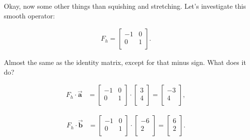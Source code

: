 Okay, now some other things than squishing and stretching. Let's investigate
this smooth operator:

\vspace{-.15in}
\begin{align*}
F_{h} =
\begin{bmatrix}
-1 & 0 \\
0 & 1 \\
\end{bmatrix}.
\end{align*}
\vspace{-.15in}

Almost the same as the identity matrix, except for that minus sign. What does
it do?

\vspace{-.15in}
\begin{align*}
F_{h} \cdot \overrightarrow{\textbf{a}} &=
\begin{bmatrix}
-1 & 0 \\
0 & 1 \\
\end{bmatrix} \cdot
\begin{bmatrix}
3 \\ 4 \\
\end{bmatrix} =
\begin{bmatrix}
-3 \\ 4 \\
\end{bmatrix},
\end{align*}

\vspace{-.15in}
\begin{align*}
F_{h} \cdot \overrightarrow{\textbf{b}} &=
\begin{bmatrix}
-1 & 0 \\
0 & 1 \\
\end{bmatrix} \cdot
\begin{bmatrix}
-6 \\ 2 \\
\end{bmatrix} =
\begin{bmatrix}
6 \\ 2 \\
\end{bmatrix}.
\end{align*}

